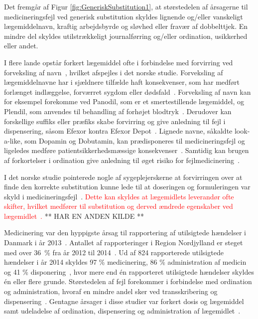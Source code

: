 Det fremgår af Figur \ref{fig:GeneriskSubstitution1}, at størstedelen af årsagerne til medicineringsfejl ved generisk substitution skyldes lignende og/eller vanskeligt lægemiddelnavn, kraftig arbejdsbyrde og sløvhed eller fravær af dobbelttjek. En mindre del skyldes utilstrækkeligt journalførring og/eller ordination, usikkerhed eller andet. 

I flere lande opstår forkert lægemiddel ofte i forbindelse med forvirring ved forveksling af navn~\citep{DanskSelskabforPatientsikkerhed2009}, hvilket afspejles i det norske studie. Forveksling af lægemiddelnavne har i sjældnere tilfælde haft konsekvenser, som har medført forlænget indlæggelse, forværret sygdom eller dødsfald~\citep{DanskSelskabforPatientsikkerhed2009}. Forveksling af navn kan for eksempel forekomme ved Panodil, som er et smertestillende lægemiddel, og Plendil, som anvendes til behandling af forhøjet blodtryk~\citep{DanskSelskabforPatientsikkerhed2009}. Derudover kan forskellige suffiks eller præfiks skabe forvirring og give anledning til fejl i dispensering, såsom Efexor kontra Efexor Depot~\citep{DanskSelskabforPatientsikkerhed2009}. Lignede navne, såkaldte look-a-like, som Dopamin og Dobutamin, kan prædisponeres til medicineringsfejl og ligeledes medføre patientsikkerhedsmæssige konsekvenser~\citep{Wittich2014}. Samtidig kan brugen af forkortelser i ordination give anledning til øget risiko for fejlmedicinering~\citep{Wittich2014}.

I det norske studie pointerede nogle af sygeplejerskerne at forvirringen over at finde den korrekte substitution kunne lede til at doseringen og formuleringen var skyld i medicineringsfejl~\citep{Hakonsen2010}. \textcolor{red}{Dette kan skyldes at lægemidlets leverandør ofte skifter, hvilket medfører til substitution og derved ændrede egenskaber ved lægemidlet~\citep{Wittich2014}.} ** HAR EN ANDEN KILDE **

Medicinering var den hyppigste årsag til rapportering af utilsigtede hændelser i Danmark i år 2013~\citep{Patientombuddet2013}. Antallet af rapporteringer i Region Nordjylland er steget med over 36~\% fra år 2012 til 2014~\citep{Jensen2014}. Ud af 824 rapporterede utilsigtede hændelser i år 2014 skyldes 97 \% medicinering, 86 \% administration af medicin og 41 \% disponering~\citep{Jensen2014}, hvor mere end én rapporteret utilsigtede hændelser skyldes én eller flere grunde. Størstedelen af fejl forekommer i forbindelse med ordination og administration, hvoraf en mindre andel sker ved transskribering og dispensering~\citep{Agrawal2009, Anderson2002}. Gentagne årsager i disse studier var forkert dosis og lægemiddel samt udeladelse af ordination, dispensering og administration af lægemidlet~\citep{Barker2002,Sundhedsstyrelsen2005,Lisby2005, Tully2009}.

